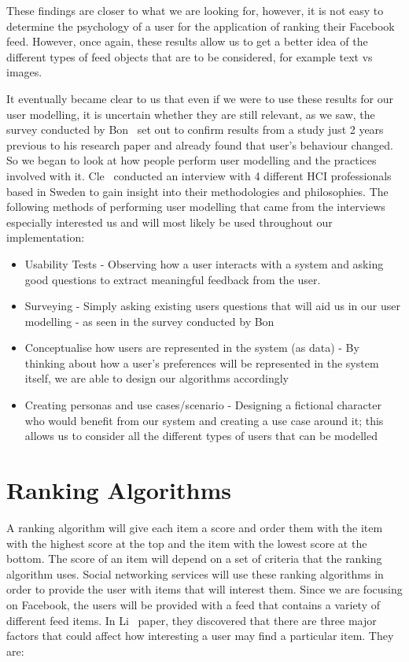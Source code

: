These findings are closer to what we are looking for, however, it is not easy to determine the psychology of a user for the application of ranking their Facebook feed. However, once again, these results allow us to get a better idea of the different types of feed objects that are to be considered, for example text vs images.

It eventually became clear to us that even if we were to use these results for our user modelling, it is uncertain whether they are still relevant, as we saw, the survey conducted by Bon~\cite{bonds2010myspace} set out to confirm results from a study just 2 years previous to his research paper and already found that user's behaviour changed. So we began to look at how people perform user modelling and the practices involved with it. Cle~\cite{clemmensen2004four} conducted an interview with 4 different HCI professionals based in Sweden to gain insight into their methodologies and philosophies. The following methods of performing user modelling that came from the interviews especially interested us and will most likely be used throughout our implementation:

\begin{itemize}
\item Usability Tests - Observing how a user interacts with a system and asking good questions to extract meaningful feedback from the user.
\item Surveying - Simply asking existing users questions that will aid us in our user modelling - as seen in the survey conducted by Bon~\cite{bonds2010myspace}
\item Conceptualise how users are represented in the system (as data) - By thinking about how a user's preferences will be represented in the system itself, we are able to design our algorithms accordingly
\item Creating personas and use cases/scenario - Designing a fictional character who would benefit from our system and creating a use case around it; this allows us to consider all the different types of users that can be modelled
\end{itemize}

\newpage
\section{Ranking Algorithms}

A ranking algorithm will give each item a score and order them with the item with the highest score at the top and the item with the lowest score at the bottom. The score of an item will depend on a set of criteria that the ranking algorithm uses. Social networking services will use these ranking algorithms in order to provide the user with items that will interest them. Since we are focusing on Facebook, the users will be provided with a feed that contains a variety of different feed items. In Li~\cite{LiTiaLee2010} paper, they discovered that there are three major factors that could affect how interesting a user may find a particular item. They are:

